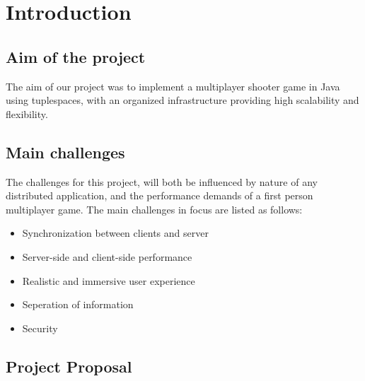  \chapter{Introduction} \label{intro}
\section{Aim of the project}
The aim of our project was to implement a multiplayer shooter game in Java using tuplespaces, with an organized infrastructure providing high scalability and flexibility.

\section{Main challenges}
% 
%
% 
% 
% 
% 

The challenges for this project, will both be influenced by nature of any distributed application, and the performance demands of a first person multiplayer game. The main challenges in focus are listed as follows:

\begin{itemize}
    \item Synchronization between clients and server
    \item Server-side and client-side performance
    \item Realistic and immersive user experience
    \item Seperation of information
    \item Security
\end{itemize}


\section{Project Proposal}

% 
% 
% 
% 
% 
% 
% 

